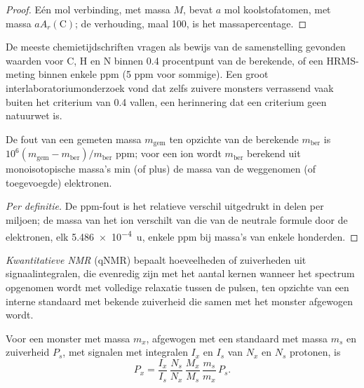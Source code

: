 \begin{proof}
Eén mol verbinding, met massa $M$, bevat $a$ mol koolstofatomen, met massa $aA_r(\mathrm C)$;
de verhouding, maal 100, is het massapercentage.
\end{proof}

De meeste chemietijdschriften vragen als bewijs van de samenstelling
gevonden waarden voor C, H en N binnen 0.4 procentpunt van de berekende,
of een HRMS-meting binnen enkele ppm (5 ppm voor sommige). Een groot
interlaboratoriumonderzoek vond dat zelfs zuivere monsters verrassend
vaak buiten het criterium van 0.4 vallen, een herinnering dat een
criterium geen natuurwet is.

\begin{proposition}\label{prop:b3:lab-techniques-3:ppm-error}
De fout van een gemeten massa $m_{\mathrm{gem}}$ ten opzichte van de berekende $m_{\mathrm{ber}}$ is
$10^6(m_{\mathrm{gem}} - m_{\mathrm{ber}})/m_{\mathrm{ber}}$ ppm; voor een ion wordt $m_{\mathrm{ber}}$ berekend uit monoisotopische massa's min (of plus) de
massa van de weggenomen (of toegevoegde) elektronen.
\end{proposition}

\begin{proof}[Per definitie]
De ppm-fout is het relatieve verschil uitgedrukt in delen per miljoen;
de massa van het ion verschilt van die van de neutrale formule door de
elektronen, elk \qty{5.486e-4}{u}, enkele ppm bij massa's van enkele
honderden.
\end{proof}

\begin{definition}\label{def:b3:lab-techniques-3:qnmr}
\emph{Kwantitatieve NMR} (qNMR) bepaalt
hoeveelheden of zuiverheden uit signaalintegralen, die evenredig zijn met
het aantal kernen wanneer het spectrum opgenomen wordt met volledige
relaxatie tussen de pulsen, ten opzichte van een interne standaard met
bekende zuiverheid die samen met het monster afgewogen wordt.
\end{definition}

\begin{proposition}\label{prop:b3:lab-techniques-3:qnmr}
Voor een monster met massa $m_x$, afgewogen met een standaard met massa $m_s$ en zuiverheid $P_s$, met signalen
met integralen $I_x$ en $I_s$ van $N_x$ en $N_s$ protonen, is
\[
  P_x = \frac{I_x}{I_s}\,\frac{N_s}{N_x}\,\frac{M_x}{M_s}\,\frac{m_s}{m_x}\,P_s.
\]
\end{proposition}

